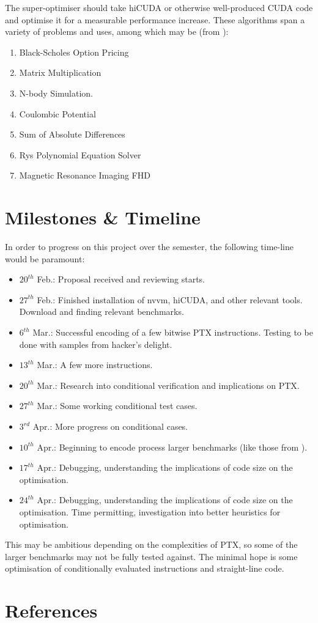 \documentclass[letterpaper,twocolumn,10pt]{article}
\begin{document}
The super-optimiser should take hiCUDA or otherwise
well-produced CUDA code and optimise it for
a measurable performance increase.
These algorithms span a variety of problems and uses,
among which may be (from \cite{hicuda}):
\begin{enumerate}
    \item Black-Scholes Option Pricing
    \item Matrix Multiplication
    \item N-body Simulation.
    \item Coulombic Potential
    \item Sum of Absolute Differences
    \item Rys Polynomial Equation Solver
    \item Magnetic Resonance Imaging FHD
\end{enumerate}

\section{Milestones \& Timeline}

In order to progress on this project over the semester,
the following time-line would be paramount:
\begin{itemize}
    \item $20^{th}$ Feb.: Proposal received and reviewing starts.
    \item $27^{th}$ Feb.: Finished installation of nvvm, hiCUDA, and other relevant tools. Download and finding relevant benchmarks.
    \item $6^{th}$ Mar.: Successful encoding of a few bitwise PTX instructions. Testing to be done with samples from hacker's delight.
    \item $13^{th}$ Mar.: A few more instructions.
    \item $20^{th}$ Mar.: Research into conditional verification and implications on PTX.
    \item $27^{th}$ Mar.: Some working conditional test cases.
    \item $3^{rd}$ Apr.: More progress on conditional cases.
    \item $10^{th}$ Apr.: Beginning to encode process larger benchmarks (like those from \cite{hicuda}).
    \item $17^{th}$ Apr.: Debugging, understanding the implications of code size on the optimisation.
    \item $24^{th}$ Apr.: Debugging, understanding the implications of code size on the optimisation. Time permitting, investigation into better heuristics for optimisation.
\end{itemize}

This may be ambitious depending on the complexities
of PTX, so some of the larger benchmarks may not be
fully tested against. The minimal hope is some
optimisation of conditionally evaluated instructions
and straight-line code.

\section{References}


\end{document}
